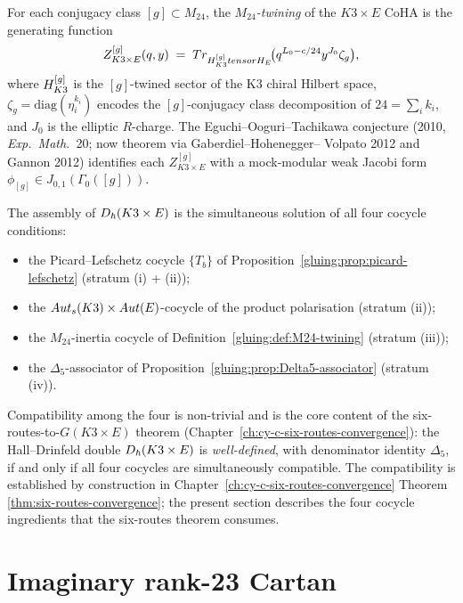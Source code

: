 \begin{definition}
\label{gluing:def:M24-twining}
For each conjugacy class $[g] \subset M_{24}$, the
\emph{$M_{24}$-twining} of the $K3 \times E$ CoHA is the
generating function
\[
 Z^{[g]}_{K3 \times E}(q, y) \;=\;
 Tr_{H_{K3}^{[g]} tensor H_E}\!\bigl(q^{L_0 - c/24} y^{J_0}
 \zeta_g\bigr),
\]
where $H_{K3}^{[g]}$ is the $[g]$-twined sector of the K3 chiral
Hilbert space, $\zeta_g = \mathrm{diag}(\eta^{k_i}_i)$ encodes the
$[g]$-conjugacy class decomposition of $24 = \sum_i k_i$, and $J_0$
is the elliptic $R$-charge. The Eguchi--Ooguri--Tachikawa conjecture
(2010, \emph{Exp.\ Math.}~20; now theorem via Gaberdiel--Hohenegger--
Volpato 2012 and Gannon 2012) identifies each $Z^{[g]}_{K3 \times E}$
with a mock-modular weak Jacobi form $\phi_{[g]} \in J_{0,1}(\Gamma_0([g]))$.
\end{definition}

\begin{remark}
\label{gluing:rem:four-cocycles-one-hopf}
The assembly of $D_\hbar(K3 \times E)$ is the simultaneous
solution of all four cocycle conditions:
\begin{itemize}
 \item the Picard--Lefschetz cocycle $\{T_b\}$ of
 Proposition~\ref{gluing:prop:picard-lefschetz} (stratum (i) + (ii));
 \item the $Aut_s(K3) \times Aut(E)$-cocycle of the product
 polarisation (stratum (ii));
 \item the $M_{24}$-inertia cocycle of
 Definition~\ref{gluing:def:M24-twining} (stratum (iii));
 \item the $\Delta_5$-associator of Proposition~\ref{gluing:prop:Delta5-associator}
 (stratum (iv)).
\end{itemize}
Compatibility among the four is non-trivial and is the core content
of the six-routes-to-$G(K3 \times E)$ theorem
(Chapter~\ref{ch:cy-c-six-routes-convergence}): the Hall--Drinfeld
double $D_\hbar(K3 \times E)$ is \emph{well-defined}, with denominator
identity $\Delta_5$, if and only if all four cocycles are
simultaneously compatible. The compatibility is established by
construction in Chapter~\ref{ch:cy-c-six-routes-convergence} Theorem
\ref{thm:six-routes-convergence}; the present section describes the
four cocycle ingredients that the six-routes theorem consumes.
\end{remark}

\section{Imaginary rank-23 Cartan}
\label{gluing:sec:k3xe-imaginary-cartan}

